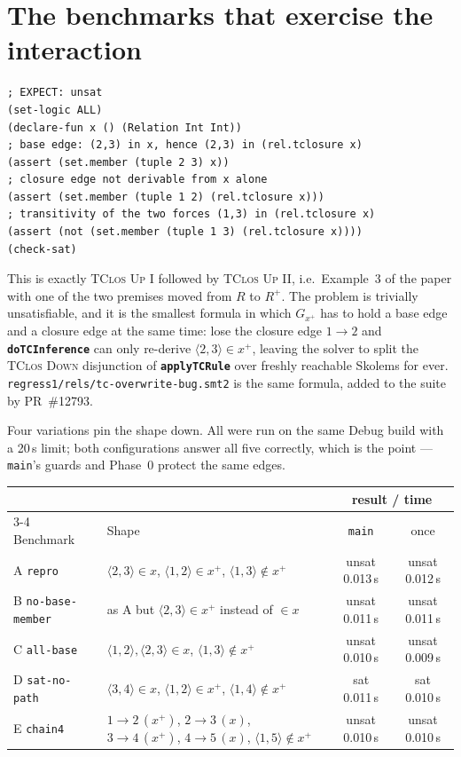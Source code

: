 \documentclass[11pt,a4paper]{article}
\newcommand{\code}[1]{\texttt{\small #1}}
\newcommand{\fn}[1]{\texttt{\small\bfseries #1}}
\newcommand{\file}[1]{\texttt{\small #1}}
\newcommand{\tup}[1]{\langle #1 \rangle}
\newcommand{\tc}[1]{{#1}^{+}}
\theoremstyle{definition}
\begin{document}
\section{The benchmarks that exercise the interaction}\label{sec:repro}

\begin{lstlisting}[style=smt]
; EXPECT: unsat
(set-logic ALL)
(declare-fun x () (Relation Int Int))
; base edge: (2,3) in x, hence (2,3) in (rel.tclosure x)
(assert (set.member (tuple 2 3) x))
; closure edge not derivable from x alone
(assert (set.member (tuple 1 2) (rel.tclosure x)))
; transitivity of the two forces (1,3) in (rel.tclosure x)
(assert (not (set.member (tuple 1 3) (rel.tclosure x))))
(check-sat)
\end{lstlisting}

\noindent
This is exactly \textsc{TClos Up I} followed by \textsc{TClos Up II}, i.e.\
Example~3 of the paper with one of the two premises moved from $R$ to $\tc{R}$.
The problem is trivially unsatisfiable, and it is the smallest formula in which
$G_{\tc{x}}$ has to hold a base edge and a closure edge at the same time: lose
the closure edge $1\to2$ and \fn{doTCInference} can only re-derive
$\tup{2,3}\in\tc{x}$, leaving the solver to split the \textsc{TClos Down}
disjunction of \fn{applyTCRule} over freshly reachable Skolems for ever.
\file{regress1/rels/tc-overwrite-bug.smt2} is the same formula, added to the
suite by PR~\#12793.

Four variations pin the shape down. All were run on the same Debug build with a
20\,s limit; both configurations answer all five correctly, which is the point
--- \code{main}'s guards and Phase~0 protect the same edges.

\begin{center}\small
\renewcommand{\arraystretch}{1.15}
\begin{tabular}{@{}llcc@{}}
\toprule
& & \multicolumn{2}{c}{result / time}\\
\cmidrule(l){3-4}
Benchmark & Shape & \code{main} & once\\
\midrule
A \code{repro} & $\tup{2,3}\in x$, $\tup{1,2}\in\tc{x}$, $\tup{1,3}\notin\tc{x}$
  & unsat 0.013\,s & unsat 0.012\,s\\
B \code{no-base-member} & as A but $\tup{2,3}\in\tc{x}$ instead of $\in x$
  & unsat 0.011\,s & unsat 0.011\,s\\
C \code{all-base} & $\tup{1,2},\tup{2,3}\in x$, $\tup{1,3}\notin\tc{x}$
  & unsat 0.010\,s & unsat 0.009\,s\\
D \code{sat-no-path} & $\tup{3,4}\in x$, $\tup{1,2}\in\tc{x}$, $\tup{1,4}\notin\tc{x}$
  & sat 0.011\,s & sat 0.010\,s\\
E \code{chain4} & $1\!\to\!2\,(\tc{x})$, $2\!\to\!3\,(x)$, $3\!\to\!4\,(\tc{x})$,
  $4\!\to\!5\,(x)$, $\tup{1,5}\notin\tc{x}$
  & unsat 0.010\,s & unsat 0.010\,s\\
\bottomrule
\end{tabular}
\end{center}
\end{document}
